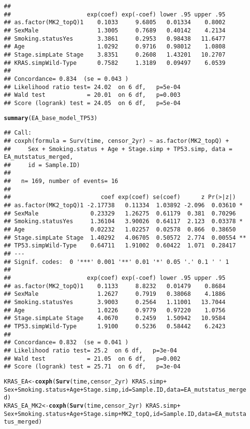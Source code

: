 \documentclass{article}\usepackage[]{graphicx}\usepackage[]{color}
\makeatletter
\newcommand{\hlopt}[1]{\textcolor[rgb]{0,0,0}{#1}}%
\newcommand{\hlstd}[1]{\textcolor[rgb]{0.345,0.345,0.345}{#1}}%
\newcommand{\hlkwb}[1]{\textcolor[rgb]{0.69,0.353,0.396}{#1}}%
\newcommand{\hlkwc}[1]{\textcolor[rgb]{0.333,0.667,0.333}{#1}}%
\newcommand{\hlkwd}[1]{\textcolor[rgb]{0.737,0.353,0.396}{\textbf{#1}}}%
\newenvironment{kframe}{%
 \def\at@end@of@kframe{}%
 \ifinner\ifhmode%
  \def\at@end@of@kframe{\end{minipage}}%
  \begin{minipage}{\columnwidth}%
 \fi\fi%
 \def\FrameCommand##1{\hskip\@totalleftmargin \hskip-\fboxsep
 \colorbox{shadecolor}{##1}\hskip-\fboxsep
     \hskip-\linewidth \hskip-\@totalleftmargin \hskip\columnwidth}%
 \MakeFramed {\advance\hsize-\width
   \@totalleftmargin\z@ \linewidth\hsize
   \@setminipage}}%
 {\par\unskip\endMakeFramed%
 \at@end@of@kframe}
\newenvironment{knitrout}{}{} %
\makeatother
\begin{document}
\begin{knitrout}
\begin{kframe}
\begin{verbatim}
## 
##                      exp(coef) exp(-coef) lower .95 upper .95
## as.factor(MK2_topQ)1    0.1033     9.6805   0.01334    0.8002
## SexMale                 1.3005     0.7689   0.40142    4.2134
## Smoking.statusYes       3.3861     0.2953   0.98438   11.6477
## Age                     1.0292     0.9716   0.98012    1.0808
## Stage.simpLate Stage    3.8351     0.2608   1.43201   10.2707
## KRAS.simpWild-Type      0.7582     1.3189   0.09497    6.0539
## 
## Concordance= 0.834  (se = 0.043 )
## Likelihood ratio test= 24.02  on 6 df,   p=5e-04
## Wald test            = 20.01  on 6 df,   p=0.003
## Score (logrank) test = 24.05  on 6 df,   p=5e-04
\end{verbatim}
\begin{alltt}
\hlkwd{summary}\hlstd{(EA_base_model_TP53)}
\end{alltt}
\begin{verbatim}
## Call:
## coxph(formula = Surv(time, censor_2yr) ~ as.factor(MK2_topQ) + 
##     Sex + Smoking.status + Age + Stage.simp + TP53.simp, data = EA_mutstatus_merged, 
##     id = Sample.ID)
## 
##   n= 169, number of events= 16 
## 
##                          coef exp(coef) se(coef)      z Pr(>|z|)   
## as.factor(MK2_topQ)1 -2.17738   0.11334  1.03892 -2.096  0.03610 * 
## SexMale               0.23329   1.26275  0.61179  0.381  0.70296   
## Smoking.statusYes     1.36104   3.90026  0.64117  2.123  0.03378 * 
## Age                   0.02232   1.02257  0.02578  0.866  0.38650   
## Stage.simpLate Stage  1.40292   4.06705  0.50572  2.774  0.00554 **
## TP53.simpWild-Type    0.64711   1.91002  0.60422  1.071  0.28417   
## ---
## Signif. codes:  0 '***' 0.001 '**' 0.01 '*' 0.05 '.' 0.1 ' ' 1
## 
##                      exp(coef) exp(-coef) lower .95 upper .95
## as.factor(MK2_topQ)1    0.1133     8.8232   0.01479    0.8684
## SexMale                 1.2627     0.7919   0.38068    4.1886
## Smoking.statusYes       3.9003     0.2564   1.11001   13.7044
## Age                     1.0226     0.9779   0.97220    1.0756
## Stage.simpLate Stage    4.0670     0.2459   1.50942   10.9584
## TP53.simpWild-Type      1.9100     0.5236   0.58442    6.2423
## 
## Concordance= 0.832  (se = 0.041 )
## Likelihood ratio test= 25.2  on 6 df,   p=3e-04
## Wald test            = 21.05  on 6 df,   p=0.002
## Score (logrank) test = 25.71  on 6 df,   p=3e-04
\end{verbatim}
\begin{alltt}
\hlstd{KRAS_EA} \hlkwb{<-} \hlkwd{coxph}\hlstd{(}\hlkwd{Surv}\hlstd{(time, censor_2yr)} \hlopt{~} \hlstd{KRAS.simp}\hlopt{+}
                         \hlstd{Sex}\hlopt{+}\hlstd{Smoking.status}\hlopt{+}\hlstd{Age}\hlopt{+}\hlstd{Stage.simp,} \hlkwc{id}\hlstd{=Sample.ID,} \hlkwc{data}\hlstd{=EA_mutstatus_merged)}
\hlstd{KRAS_EA_MK2} \hlkwb{<-} \hlkwd{coxph}\hlstd{(}\hlkwd{Surv}\hlstd{(time, censor_2yr)} \hlopt{~} \hlstd{KRAS.simp}\hlopt{+}
                         \hlstd{Sex}\hlopt{+}\hlstd{Smoking.status}\hlopt{+}\hlstd{Age}\hlopt{+}\hlstd{Stage.simp}\hlopt{+}\hlstd{MK2_topQ,} \hlkwc{id}\hlstd{=Sample.ID,} \hlkwc{data}\hlstd{=EA_mutstatus_merged)}


\end{alltt}
\end{kframe}
\end{knitrout}
\end{document}
